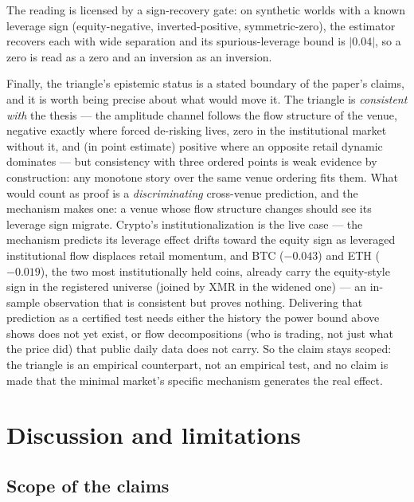 \documentclass[11pt]{article}
\begin{document}
The reading is licensed by a sign-recovery gate: on synthetic worlds with a
known leverage sign (equity-negative, inverted-positive, symmetric-zero), the
estimator recovers each with wide separation and its spurious-leverage bound
is $|0.04|$, so a zero is read as a zero and an inversion as an inversion.

Finally, the triangle's epistemic status is a stated boundary of the paper's
claims, and it is worth being precise about what would move it. The triangle
is \emph{consistent with} the
thesis --- the amplitude channel follows the flow structure of the venue,
negative exactly where forced de-risking lives, zero in the institutional
market without it, and (in point estimate) positive where an opposite retail
dynamic dominates --- but consistency with three ordered points is weak
evidence by construction: any monotone story over the same venue ordering
fits them. What would count as proof is a \emph{discriminating} cross-venue
prediction, and the mechanism makes one: a venue whose flow structure
changes should see its leverage sign migrate. Crypto's institutionalization
is the live case --- the mechanism predicts its leverage effect drifts
toward the equity sign as leveraged institutional flow displaces retail
momentum, and BTC ($-0.043$) and ETH ($-0.019$), the two most
institutionally held coins, already carry the equity-style sign in the
registered universe (joined by XMR in the widened one) --- an in-sample
observation that is consistent but proves nothing. Delivering that
prediction as a certified test needs either the history the power bound
above shows does not yet exist, or flow decompositions (who is trading, not
just what the price did) that public daily data does not carry. So the
claim stays scoped: the triangle is an empirical counterpart, not an
empirical test, and no claim is made that the
minimal market's specific mechanism generates the real effect.

\section{Discussion and limitations}
\label{sec:discussion}

\subsection{Scope of the claims}
\label{sec:scope}
\end{document}
